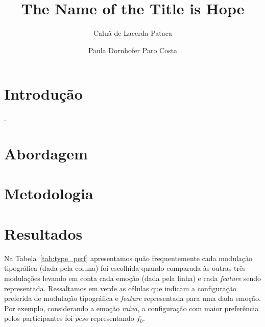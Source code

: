 \documentclass[11pt]{article}
\title{The Name of the Title is Hope}
\author{Caluã de Lacerda Pataca \and Paula Dornhofer Paro Costa}
\begin{document}
\hyphenation{}
\pagestyle{fancy}


  \section{Introdu\c{c}\~{a}o}
  \label{sec:introducao}

   .

  \section{Abordagem}
  \label{sec:abordagem}
  
  
  \section{Metodologia}
  \label{sec:metodologia}
  
  


\section{Resultados}
  \label{sec:resultados}
  
  Na Tabela~\ref{tab:type_perf} apresentamos quão frequentemente cada modulação tipográfica (dada pela coluna) foi escolhida quando comparada às outras três modulações levando em conta cada emoção (dada pela linha) e cada {\itshape feature} sendo representada. Ressaltamos em verde as células que indicam a configuração preferida de modulação tipográfica e {\itshape feature} representada para uma dada emoção. Por exemplo, considerando a emoção {\itshape raiva}, a configuração com maior preferência pelos participantes foi {\itshape peso} representando $f_0$.
  
  
\end{document}
